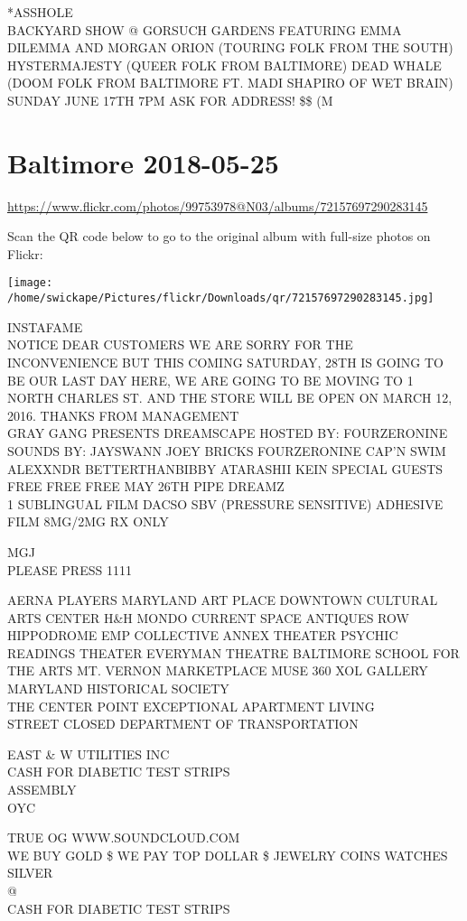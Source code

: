 \documentclass[10pt,letterpaper]{article}
\begin{document}
*ASSHOLE\\
BACKYARD SHOW @ GORSUCH GARDENS FEATURING EMMA DILEMMA AND MORGAN ORION (TOURING FOLK FROM THE SOUTH) HYSTERMAJESTY (QUEER FOLK FROM BALTIMORE) DEAD WHALE (DOOM FOLK FROM BALTIMORE FT. MADI SHAPIRO OF WET BRAIN) SUNDAY JUNE 17TH 7PM ASK FOR ADDRESS! \$\$ (M


\section*{Baltimore 2018-05-25}

\url{https://www.flickr.com/photos/99753978@N03/albums/72157697290283145}

Scan the QR code below to go to the original album with full-size photos on Flickr:

\texttt{[image: /home/swickape/Pictures/flickr/Downloads/qr/72157697290283145.jpg]}


INSTAFAME\\
NOTICE DEAR CUSTOMERS WE ARE SORRY FOR THE INCONVENIENCE BUT THIS COMING SATURDAY, 28TH IS GOING TO BE OUR LAST DAY HERE, WE ARE GOING TO BE MOVING TO 1 NORTH CHARLES ST. AND THE STORE WILL BE OPEN ON MARCH 12, 2016.  THANKS FROM MANAGEMENT\\
GRAY GANG PRESENTS DREAMSCAPE HOSTED BY: FOURZERONINE SOUNDS BY: JAYSWANN JOEY BRICKS FOURZERONINE CAP'N SWIM ALEXXNDR BETTERTHANBIBBY ATARASHII KEIN SPECIAL GUESTS FREE FREE FREE MAY 26TH PIPE DREAMZ\\
1 SUBLINGUAL FILM DACSO SBV (PRESSURE SENSITIVE) ADHESIVE FILM 8MG/2MG RX ONLY

MGJ\\
PLEASE PRESS 1111

AERNA PLAYERS MARYLAND ART PLACE DOWNTOWN CULTURAL ARTS CENTER H\&H MONDO CURRENT SPACE ANTIQUES ROW\\
HIPPODROME EMP COLLECTIVE ANNEX THEATER PSYCHIC READINGS THEATER EVERYMAN THEATRE BALTIMORE SCHOOL FOR THE ARTS MT. VERNON MARKETPLACE MUSE 360 XOL GALLERY MARYLAND HISTORICAL SOCIETY\\
THE CENTER POINT EXCEPTIONAL APARTMENT LIVING\\
STREET CLOSED DEPARTMENT OF TRANSPORTATION

EAST  \& W UTILITIES INC\\
CASH FOR DIABETIC TEST STRIPS\\
ASSEMBLY\\
OYC

TRUE OG WWW.SOUNDCLOUD.COM\\
WE BUY GOLD \$ WE PAY TOP DOLLAR \$ JEWELRY COINS WATCHES SILVER\\
@\\
CASH FOR DIABETIC TEST STRIPS
\end{document}
